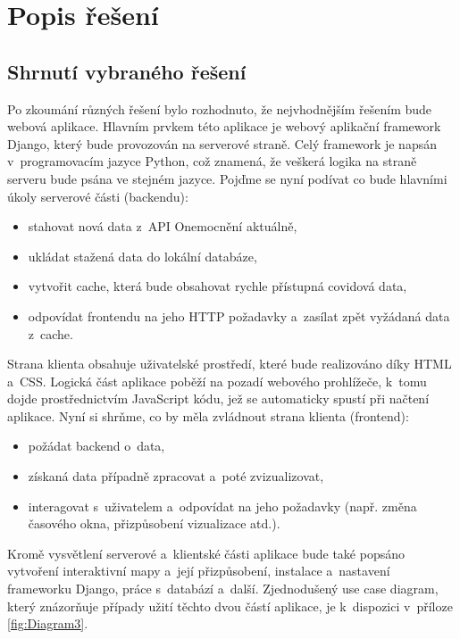 \chapter{Popis řešení}

\section{Shrnutí vybraného řešení}

Po zkoumání různých řešení bylo rozhodnuto, že nejvhodnějším řešením bude webová aplikace. Hlavním prvkem této aplikace je webový aplikační framework Django, který bude provozován na serverové straně. Celý framework je napsán v~programovacím jazyce Python, což znamená, že veškerá logika na straně serveru bude psána ve stejném jazyce. Pojďme se nyní podívat co bude hlavními úkoly serverové části (backendu):

\begin{itemize}
    \item stahovat nová data z~API Onemocnění aktuálně,
    \item ukládat stažená data do lokální databáze,
    \item vytvořit cache, která bude obsahovat rychle přístupná covidová data,
    \item odpovídat frontendu na jeho HTTP požadavky a~zasílat zpět vyžádaná data z~cache.
\end{itemize}

Strana klienta obsahuje uživatelské prostředí, které bude realizováno díky HTML a~CSS. Logická část aplikace poběží na pozadí webového prohlížeče, k~tomu dojde prostřednictvím JavaScript kódu, jež se automaticky spustí při načtení aplikace. Nyní si shrňme, co by měla zvládnout strana klienta (frontend):

\begin{itemize}
    \item požádat backend o~data,
    \item získaná data případně zpracovat a~poté zvizualizovat,
    \item interagovat s~uživatelem a~odpovídat na jeho požadavky (např. změna časového okna, přizpůsobení vizualizace atd.).
\end{itemize}

Kromě vysvětlení serverové a~klientské části aplikace bude také popsáno vytvoření interaktivní mapy a~její přizpůsobení, instalace a~nastavení frameworku Django, práce s~databází a~další. Zjednodušený use case diagram, který znázorňuje případy užití těchto dvou částí aplikace, je k~dispozici v~příloze \ref{fig:Diagram3}.

